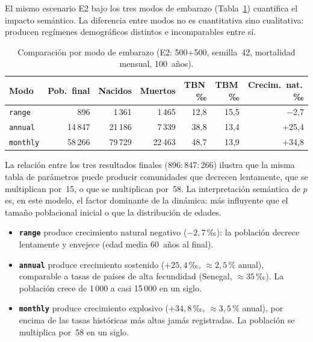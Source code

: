 \documentclass{llncs}
\begin{document}
El mismo escenario E2 bajo los tres modos de embarazo
(Tabla~\ref{tab:comp_embarazo}) cuantifica el impacto semántico.
La diferencia entre modos no es cuantitativa sino cualitativa: producen
regímenes demográficos distintos e incomparables entre sí.

\begin{table}[H]
\caption{Comparación por modo de embarazo
         (E2: 500+500, semilla~42, mortalidad mensual, 100~años).}
\label{tab:comp_embarazo}
\centering
\small
\begin{tabular}{lrrrrrr}
\toprule
\textbf{Modo} & \textbf{Pob.\ final} & \textbf{Nacidos} &
\textbf{Muertos} & \textbf{TBN\,‰} & \textbf{TBM\,‰} &
\textbf{Crecim.\ nat.\,‰} \\
\midrule
\texttt{range}   &    896 &  1\,361 &  1\,465 & 12{,}8 & 15{,}5 & $-$2{,}7 \\
\texttt{annual}  & 14\,847 & 21\,186 &  7\,339 & 38{,}8 & 13{,}4 & $+$25{,}4 \\
\texttt{monthly} & 58\,266 & 79\,729 & 22\,463 & 48{,}7 & 13{,}9 & $+$34{,}8 \\
\bottomrule
\end{tabular}
\end{table}

La relación entre los tres resultados finales
(896\;:\,847\;:\,266) ilustra que la misma tabla de parámetros
puede producir comunidades que decrecen lentamente, que se multiplican por~15,
o que se multiplican por~58.
La interpretación semántica de $p$ es, en este modelo, el factor dominante
de la dinámica: más influyente que el tamaño poblacional inicial o que la
distribución de edades.

\begin{itemize}
  \item \textbf{\texttt{range}} produce crecimiento natural negativo
        ($-2{,}7$\,‰): la población decrece lentamente y envejece
        (edad media 60~años al final).

  \item \textbf{\texttt{annual}} produce crecimiento sostenido
        ($+25{,}4$\,‰, $\approx 2{,}5\,\%$ anual), comparable a tasas de
        países de alta fecundidad (Senegal, $\approx 35$\,‰).
        La población crece de 1\,000 a casi 15\,000 en un siglo.

  \item \textbf{\texttt{monthly}} produce crecimiento explosivo
        ($+34{,}8$\,‰, $\approx 3{,}5\,\%$ anual), por encima de las
        tasas históricas más altas jamás registradas.
        La población se multiplica por~58 en un siglo.
\end{itemize}
\end{document}
